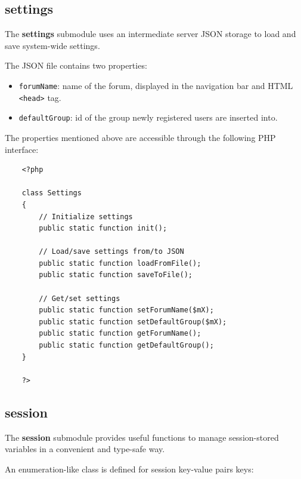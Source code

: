 \documentclass[12pt]{report}
\renewcommand\emph{\textbf}
\begin{document}
                \subsection{settings}

                    The \emph{settings} submodule uses an intermediate server JSON storage to load and save system-wide settings.

                    The JSON file contains two properties:

                    \begin{itemize}
                        \item \texttt{forumName}: name of the forum, displayed in the navigation bar and HTML \texttt{<head>} tag.
                        \item \texttt{defaultGroup}: id of the group newly registered users are inserted into.
                    \end{itemize}

                    The properties mentioned above are accessible through the following PHP interface:

                    \begin{verbatim}
    <?php

    class Settings
    {
        // Initialize settings
        public static function init();

        // Load/save settings from/to JSON
        public static function loadFromFile();
        public static function saveToFile();

        // Get/set settings
        public static function setForumName($mX);
        public static function setDefaultGroup($mX);
        public static function getForumName();
        public static function getDefaultGroup();
    }

    ?>
                    \end{verbatim}

                \subsection{session}

                    The \emph{session} submodule provides useful functions to manage session-stored variables in a convenient and type-safe way.

                    An enumeration-like class is defined for session key-value pairs keys:
\end{document}
